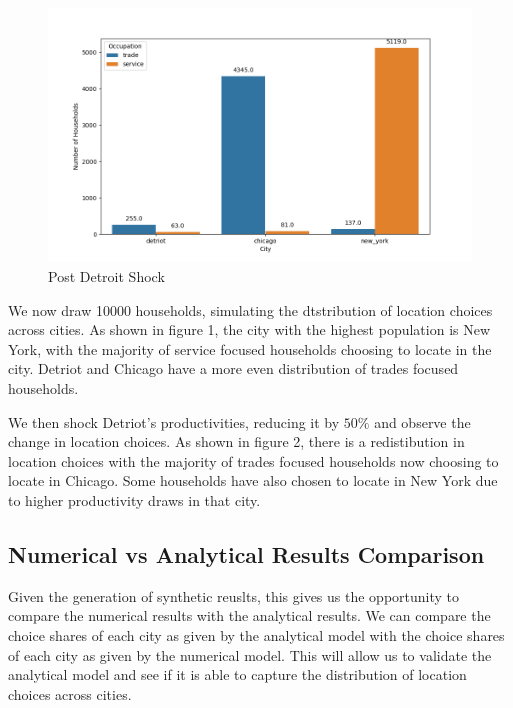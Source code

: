 \documentclass[10pt]{article}
\begin{document}
\begin{figure}
    \centering
    \includegraphics[width=\textwidth]{../simulations/graphs/c_shock.png}
    \caption{Post Detroit Shock}
    \label{c_shock}
\end{figure}

We now draw 10000 households, simulating the dtstribution of location choices across cities. As shown in figure 1, the city with the highest population is New York, with the majority of service focused households choosing to locate in the city. Detriot and Chicago have a more even distribution of trades focused households.

We then shock Detriot's productivities, reducing it by $50\%$ and observe the change in location choices. As shown in figure 2, there is a redistibution in location choices with the majority of trades focused households now choosing to locate in Chicago. Some households have also chosen to locate in New York due to higher productivity draws in that city.

\subsection{Numerical vs Analytical Results Comparison}

Given the generation of synthetic reuslts, this gives us the opportunity to compare the numerical results with the analytical results. We can compare the choice shares of each city as given by the analytical model with the choice shares of each city as given by the numerical model. This will allow us to validate the analytical model and see if it is able to capture the distribution of location choices across cities.
\end{document}
